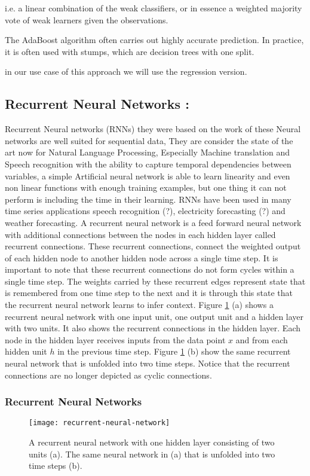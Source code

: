 i.e. a linear combination of the weak classifiers, or in essence a weighted majority vote of weak learners given the observations.

The AdaBoost algorithm often carries out highly accurate prediction.
In practice, it is often used with stumps, which are decision trees with one split.

in our use case of this approach we will use the regression version.


\subsection{Recurrent Neural Networks :}
Recurrent Neural networks (RNNs) they were based on the work of   \cite{rnn_hist} these Neural networks are  well suited for sequential  data, They are consider the state of the art now for Natural Language Processing, Especially Machine translation \citet{} and Speech recognition \citet{including126speech} with the ability to capture temporal dependencies between variables, a simple Artificial neural network is able to learn linearity and even non linear functions with enough training examples, but one thing it can not perform is including the time in their learning.  RNNs have been used in many time series applications speech recognition (?), electricity forecasting (?)  and weather forecasting.
A recurrent neural network is a feed forward neural network with additional connections between the nodes in each hidden layer called recurrent connections. These recurrent connections, connect the weighted output of each hidden node to another hidden node across a single time step. It is important to note that these recurrent connections do not form cycles within a single time step. The weights carried by these recurrent edges represent state that is remembered from one time step to the next and it is through this state that the recurrent neural network learns to infer context\cite{DBLP:journals/corr/Lipton15}.
Figure \ref{fig:recurrent-neural-network} (a) shows a recurrent neural network with one input unit, one output unit and a hidden layer with two units. It also shows the recurrent connections in the hidden layer. Each node in the hidden layer receives inputs from the data point $x$ and from each hidden unit $h$ in the previous time step. Figure \ref{fig:recurrent-neural-network} (b) show the same recurrent neural network that is unfolded into two time steps. Notice that the recurrent connections are no longer depicted as cyclic connections.

\subsubsection{Recurrent Neural Networks}
\begin{figure}
\centering	
\texttt{[image: recurrent-neural-network]}
\caption{A recurrent neural network with one hidden layer consisting of two units (a). The same neural network in (a) that is unfolded into two time steps (b).}
\label{fig:recurrent-neural-network}
\end{figure}

